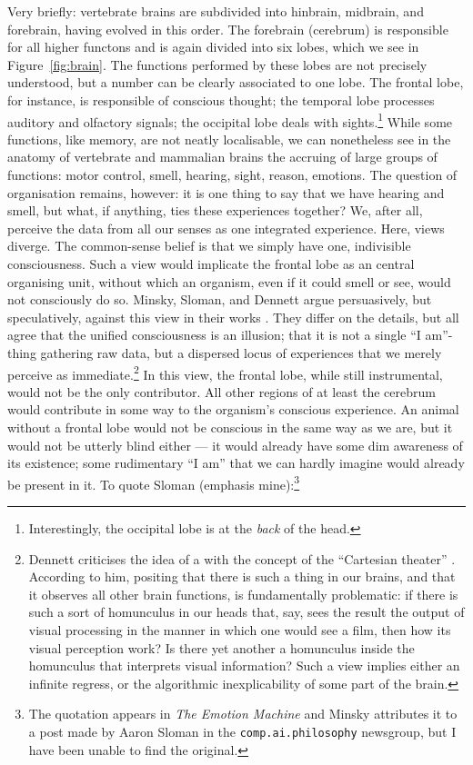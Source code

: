 Very briefly: vertebrate brains are subdivided into hinbrain, midbrain, and forebrain, having evolved in this order. The forebrain (cerebrum) is responsible for all higher functons and is again divided into six lobes, which we see in Figure~\ref{fig:brain}. The functions performed by these lobes are not precisely understood, but a number can be clearly associated to one lobe. The frontal lobe, for instance, is responsible of conscious thought; the temporal lobe processes auditory and olfactory signals; the occipital lobe deals with sights.\footnote{Interestingly, the occipital lobe is at the {\em back} of the head.} While some functions, like memory, are not neatly localisable, we can nonetheless see in the anatomy of vertebrate and mammalian brains the accruing of large groups of functions: motor control, smell, hearing, sight, reason, emotions. The question of organisation remains, however: it is one thing to say that we have hearing and smell, but what, if anything, ties these experiences together? We, after all, perceive the data from all our senses as one integrated experience. Here, views diverge. The common-sense belief is that we simply have one, indivisible consciousness. Such a view would implicate the frontal lobe as an central organising unit, without which an organism, even if it could smell or see, would not consciously do so. Minsky, Sloman, and Dennett argue persuasively, but speculatively, against this view in their works \cite{emotionMachine,societyOfMind,sloman1991, dennett1991}. They differ on the details, but all agree that the unified consciousness is an illusion; that it is not a single ``I am''-thing gathering raw data, but a dispersed locus of experiences that we merely perceive as immediate.\footnote{Dennett criticises the idea of a  with the concept of the ``Cartesian theater'' \cite{dennett1991}. According to him, positing that there is such a thing in our brains, and that it observes all other brain functions, is fundamentally problematic: if there is such a sort of homunculus in our heads that, say, sees the result the output of visual processing in the manner in which one would see a film, then how its visual perception work? Is there yet another a homunculus inside the homunculus that interprets visual information? Such a view implies either an infinite regress, or the algorithmic inexplicability of some part of the brain.} In this view, the frontal lobe, while still instrumental, would not be the only contributor. All other regions of at least the cerebrum would contribute in some way to the organism's conscious experience. An animal without a frontal lobe would not be conscious in the same way as we are, but it would not be utterly blind either --- it would already have some dim awareness of its existence; some rudimentary ``I am'' that we can hardly imagine would already be present in it. To quote Sloman (emphasis mine):\footnote{The quotation appears in {\em The Emotion Machine} \cite[p. 97]{emotionMachine} and Minsky attributes it to a post made by Aaron Sloman in the \texttt{comp.ai.philosophy} newsgroup, but I have been unable to find the original.}
